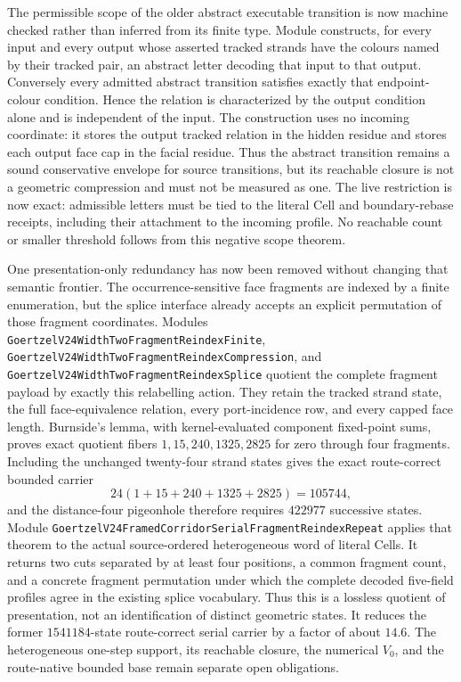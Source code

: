 \documentclass[11pt]{article}
\theoremstyle{definition}
\begin{document}
The permissible scope of the older abstract executable transition is now
machine checked rather than inferred from its finite type.  Module
constructs, for every input and every output whose asserted tracked strands
have the colours named by their tracked pair, an abstract letter decoding that
input to that output.  Conversely every admitted abstract transition satisfies
exactly that endpoint-colour condition.  Hence the relation is characterized
by the output condition alone and is independent of the input.  The
construction uses no incoming coordinate: it stores
the output tracked relation in the hidden residue and stores each output face
cap in the facial residue.  Thus the abstract transition remains a sound
conservative envelope for source transitions, but its reachable closure is
not a geometric compression and must not be measured as one.  The live
restriction is now exact: admissible letters must be tied to the literal Cell
and boundary-rebase receipts, including their attachment to the incoming
profile.  No reachable count or smaller threshold follows from this negative
scope theorem.

One presentation-only redundancy has now been removed without changing that
semantic frontier.  The occurrence-sensitive face fragments are indexed by a
finite enumeration, but the splice interface already accepts an explicit
permutation of those fragment coordinates.  Modules
\texttt{GoertzelV24WidthTwoFragmentReindexFinite},
\texttt{GoertzelV24WidthTwoFragmentReindexCompression}, and
\texttt{GoertzelV24WidthTwoFragmentReindexSplice} quotient the complete
fragment payload by exactly this relabelling action.  They retain the tracked
strand state, the full face-equivalence relation, every port-incidence row,
and every capped face length.  Burnside's lemma, with kernel-evaluated
component fixed-point sums, proves exact quotient fibers
$1,15,240,1325,2825$ for zero through four fragments.  Including the unchanged
twenty-four strand states gives the exact route-correct bounded carrier
\[
  24(1+15+240+1325+2825)=105744,
\]
and the distance-four pigeonhole therefore requires $422977$ successive
states.  Module
\texttt{GoertzelV24FramedCorridorSerialFragmentReindexRepeat} applies that
theorem to the actual source-ordered heterogeneous word of literal Cells.  It
returns two cuts separated by at least four positions, a common fragment
count, and a concrete fragment permutation under which the complete decoded
five-field profiles agree in the existing splice vocabulary.  Thus this is a
lossless quotient of presentation, not an identification of distinct
geometric states.  It reduces the former $1541184$-state route-correct serial
carrier by a factor of about $14.6$.  The heterogeneous one-step support, its
reachable closure, the numerical $V_0$, and the route-native bounded base
remain separate open obligations.
\end{document}
